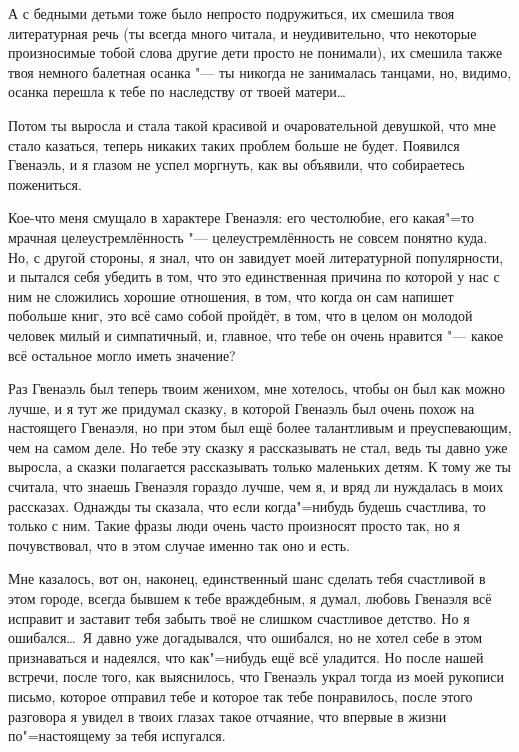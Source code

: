 А с бедными детьми тоже было непросто подружиться, их смешила твоя литературная
речь (ты всегда много читала, и неудивительно, что некоторые произносимые тобой
слова другие дети просто не понимали), их смешила также твоя немного балетная
осанка "--- ты никогда не занималась танцами, но, видимо, осанка перешла к тебе
по наследству от твоей матери\ldots

Потом ты выросла и стала такой красивой и очаровательной девушкой, что мне стало
казаться, теперь никаких таких проблем больше не будет.
Появился Гвенаэль, и я глазом не успел моргнуть, как вы объявили, что
собираетесь пожениться.

Кое-что меня смущало в характере Гвенаэля: его честолюбие, его какая"=то мрачная
целеустремлённость "--- целеустремлённость не совсем понятно куда.
Но, с другой стороны, я знал, что он завидует моей литературной популярности, и
пытался себя убедить в том, что это единственная причина по которой у нас с ним
не сложились хорошие отношения, в том, что когда он сам напишет побольше книг,
это всё само собой пройдёт, в том, что в целом он молодой человек милый и
симпатичный, и, главное, что тебе он очень нравится "--- какое всё остальное
могло иметь значение?

Раз Гвенаэль был теперь твоим женихом, мне хотелось, чтобы он был как можно
лучше, и я тут же придумал сказку, в которой Гвенаэль был очень похож на
настоящего Гвенаэля, но при этом был ещё более талантливым и преуспевающим, чем
на самом деле.
Но тебе эту сказку я рассказывать не стал, ведь ты давно уже выросла, а сказки
полагается рассказывать только маленьких детям.
К тому же ты считала, что знаешь Гвенаэля гораздо лучше, чем я, и вряд ли
нуждалась в моих рассказах. Однажды ты сказала, что если когда"=нибудь будешь
счастлива, то только с ним.
Такие фразы люди очень часто произносят просто так, но я почувствовал, что в
этом случае именно так оно и есть.

Мне казалось, вот он, наконец, единственный шанс сделать тебя счастливой в этом
городе, всегда бывшем к тебе враждебным, я думал, любовь Гвенаэля всё исправит и
заставит тебя забыть твоё не слишком счастливое детство.
Но я ошибался\ldots\
Я давно уже догадывался, что ошибался, но не хотел себе в этом признаваться и
надеялся, что как"=нибудь ещё всё уладится.
Но после нашей встречи, после того, как выяснилось, что Гвенаэль украл тогда из
моей рукописи письмо, которое отправил тебе и которое так тебе понравилось,
после этого разговора я увидел в твоих глазах такое отчаяние, что впервые в
жизни по"=настоящему за тебя испугался.

